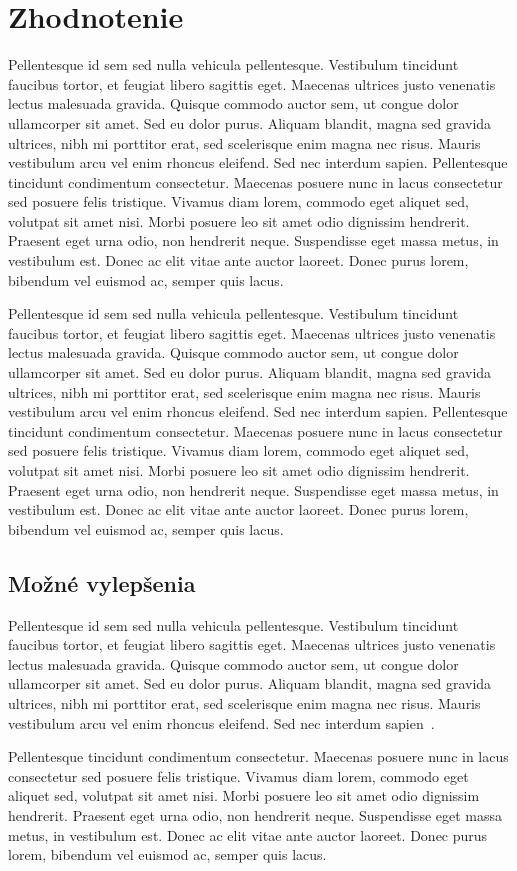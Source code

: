\newpage

\section{Zhodnotenie}

Pellentesque id sem sed nulla vehicula pellentesque. Vestibulum tincidunt faucibus tortor, et feugiat libero sagittis eget. Maecenas ultrices justo venenatis lectus malesuada gravida. Quisque commodo auctor sem, ut congue dolor ullamcorper sit amet. Sed eu dolor purus. Aliquam blandit, magna sed gravida ultrices, nibh mi porttitor erat, sed scelerisque enim magna nec risus. Mauris vestibulum arcu vel enim rhoncus eleifend. Sed nec interdum sapien. Pellentesque tincidunt condimentum consectetur. Maecenas posuere nunc in lacus consectetur sed posuere felis tristique. Vivamus diam lorem, commodo eget aliquet sed, volutpat sit amet nisi. Morbi posuere leo sit amet odio dignissim hendrerit. Praesent eget urna odio, non hendrerit neque. Suspendisse eget massa metus, in vestibulum est. Donec ac elit vitae ante auctor laoreet. Donec purus lorem, bibendum vel euismod ac, semper quis lacus.

Pellentesque id sem sed nulla vehicula pellentesque. Vestibulum tincidunt faucibus tortor, et feugiat libero sagittis eget. Maecenas ultrices justo venenatis lectus malesuada gravida. Quisque commodo auctor sem, ut congue dolor ullamcorper sit amet. Sed eu dolor purus. Aliquam blandit, magna sed gravida ultrices, nibh mi porttitor erat, sed scelerisque enim magna nec risus. Mauris vestibulum arcu vel enim rhoncus eleifend. Sed nec interdum sapien. Pellentesque tincidunt condimentum consectetur. Maecenas posuere nunc in lacus consectetur sed posuere felis tristique. Vivamus diam lorem, commodo eget aliquet sed, volutpat sit amet nisi. Morbi posuere leo sit amet odio dignissim hendrerit. Praesent eget urna odio, non hendrerit neque. Suspendisse eget massa metus, in vestibulum est. Donec ac elit vitae ante auctor laoreet. Donec purus lorem, bibendum vel euismod ac, semper quis lacus.

\subsection{Možné vylepšenia}
Pellentesque id sem sed nulla vehicula pellentesque. Vestibulum tincidunt faucibus tortor, et feugiat libero sagittis eget. Maecenas ultrices justo venenatis lectus malesuada gravida. Quisque commodo auctor sem, ut congue dolor ullamcorper sit amet. Sed eu dolor purus. Aliquam blandit, magna sed gravida ultrices, nibh mi porttitor erat, sed scelerisque enim magna nec risus. Mauris vestibulum arcu vel enim rhoncus eleifend. Sed nec interdum sapien~\cite{4}.

Pellentesque tincidunt condimentum consectetur. Maecenas posuere nunc in lacus consectetur sed posuere felis tristique. Vivamus diam lorem, commodo eget aliquet sed, volutpat sit amet nisi. Morbi posuere leo sit amet odio dignissim hendrerit. Praesent eget urna odio, non hendrerit neque. Suspendisse eget massa metus, in vestibulum est. Donec ac elit vitae ante auctor laoreet. Donec purus lorem, bibendum vel euismod ac, semper quis lacus.
